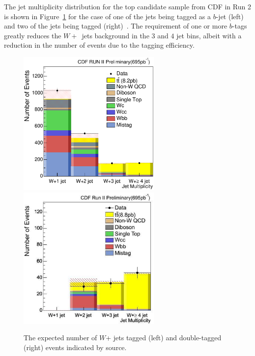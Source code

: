 \documentclass[12pt]{iopart}
\begin{document}
The jet multiplicity distribution for the top candidate sample from CDF in Run 2 is shown in
Figure~\ref{fig:b_jet_mult} for the case of one of the jets being tagged as a $b$-jet (left)
and two of the jets being
tagged (right)~\cite{Acosta:2004hw, cdfsvx}. The requirement of one or more $b$-tags greatly reduces the $W +$~jets background in the $3$ and $4$ jet
bins, albeit with a reduction in the number of events due to the tagging efficiency. 
%
\begin{figure}[t]
\begin{center}
\includegraphics[width=7cm]{Njets_Ht200_Rescale_gen5gen6_emu.eps}
\includegraphics[width=7cm]{plotFloatingBoxTop_double_tight_win06.eps}
\end{center}
\caption{The expected number of $W$+ jets tagged (left) and double-tagged (right) events indicated by source.
} 
\label{fig:b_jet_mult}
\end{figure}
%
\end{document}
